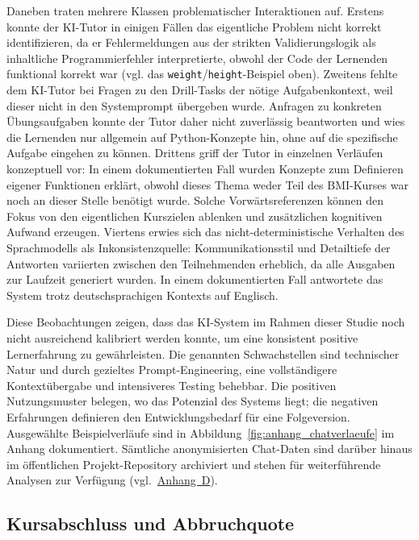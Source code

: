 Daneben traten mehrere Klassen problematischer Interaktionen auf. Erstens konnte der KI-Tutor in einigen Fällen das eigentliche Problem nicht korrekt identifizieren, da er Fehlermeldungen aus der strikten Validierungslogik als inhaltliche Programmierfehler interpretierte, obwohl der Code der Lernenden funktional korrekt war (vgl. das \texttt{weight}/\texttt{height}-Beispiel oben). Zweitens fehlte dem KI-Tutor bei Fragen zu den Drill-Tasks der nötige Aufgabenkontext, weil dieser nicht in den Systemprompt übergeben wurde. Anfragen zu konkreten Übungsaufgaben konnte der Tutor daher nicht zuverlässig beantworten und wies die Lernenden nur allgemein auf Python-Konzepte hin, ohne auf die spezifische Aufgabe eingehen zu können. Drittens griff der Tutor in einzelnen Verläufen konzeptuell vor: In einem dokumentierten Fall wurden Konzepte zum Definieren eigener Funktionen erklärt, obwohl dieses Thema weder Teil des BMI-Kurses war noch an dieser Stelle benötigt wurde. Solche Vorwärtsreferenzen können den Fokus von den eigentlichen Kurszielen ablenken und zusätzlichen kognitiven Aufwand erzeugen. Viertens erwies sich das nicht-deterministische Verhalten des Sprachmodells als Inkonsistenzquelle: Kommunikationsstil und Detailtiefe der Antworten variierten zwischen den Teilnehmenden erheblich, da alle Ausgaben zur Laufzeit generiert wurden. In einem dokumentierten Fall antwortete das System trotz deutschsprachigen Kontexts auf Englisch.

Diese Beobachtungen zeigen, dass das KI-System im Rahmen dieser Studie noch nicht ausreichend kalibriert werden konnte, um eine konsistent positive Lernerfahrung zu gewährleisten. Die genannten Schwachstellen sind technischer Natur und durch gezieltes Prompt-Engineering, eine vollständigere Kontextübergabe und intensiveres Testing behebbar. Die positiven Nutzungsmuster belegen, wo das Potenzial des Systems liegt; die negativen Erfahrungen definieren den Entwicklungsbedarf für eine Folgeversion. Ausgewählte Beispielverläufe sind in Abbildung~\ref{fig:anhang_chatverlaeufe} im Anhang dokumentiert. Sämtliche anonymisierten Chat-Daten sind darüber hinaus im öffentlichen Projekt-Repository archiviert und stehen für weiterführende Analysen zur Verfügung (vgl.\ \hyperref[appendix:daten]{Anhang~D}).

\subsection{Kursabschluss und Abbruchquote}\label{subsec:diskussion_abbruch}

